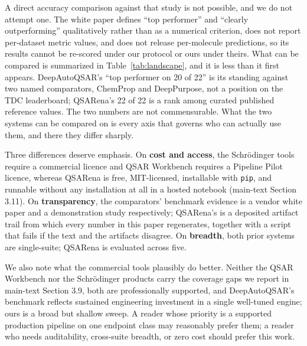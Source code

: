 \documentclass[11pt,a4paper]{article}
\begin{document}
A direct accuracy comparison against that study is not possible, and we do not attempt one. The white paper defines ``top performer'' and ``clearly outperforming'' qualitatively rather than as a numerical criterion, does not report per-dataset metric values, and does not release per-molecule predictions, so its results cannot be re-scored under our protocol or ours under theirs. What can be compared is summarized in Table~\ref{tab:landscape}, and it is less than it first appears. DeepAutoQSAR's ``top performer on 20 of 22'' is its standing against two named comparators, ChemProp and DeepPurpose, not a position on the TDC leaderboard; QSARena's 22 of 22 is a rank among curated published reference values. The two numbers are not commensurable. What the two systems can be compared on is every axis that governs who can actually use them, and there they differ sharply.

Three differences deserve emphasis. On \textbf{cost and access}, the Schr\"odinger tools require a commercial licence and QSAR Workbench requires a Pipeline Pilot licence, whereas QSARena is free, MIT-licensed, installable with \texttt{pip}, and runnable without any installation at all in a hosted notebook (main-text Section 3.11). On \textbf{transparency}, the comparators' benchmark evidence is a vendor white paper and a demonstration study respectively; QSARena's is a deposited artifact trail from which every number in this paper regenerates, together with a script that fails if the text and the artifacts disagree. On \textbf{breadth}, both prior systems are single-suite; QSARena is evaluated across five.

We also note what the commercial tools plausibly do better. Neither the QSAR Workbench nor the Schr\"odinger products carry the coverage gaps we report in main-text Section 3.9, both are professionally supported, and DeepAutoQSAR's benchmark reflects sustained engineering investment in a single well-tuned engine; ours is a broad but shallow sweep. A reader whose priority is a supported production pipeline on one endpoint class may reasonably prefer them; a reader who needs auditability, cross-suite breadth, or zero cost should prefer this work.
\end{document}
